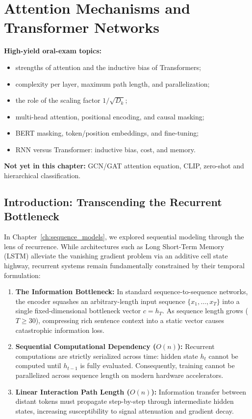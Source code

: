 \newpage

\chapter{Attention Mechanisms and Transformer Networks}\label{ch:attention_transformers}

\begin{ExamFocusBox}
\textbf{High-yield oral-exam topics:}
\begin{itemize}[nosep, leftmargin=*]
    \item strengths of attention and the inductive bias of Transformers;
    \item complexity per layer, maximum path length, and parallelization;
    \item the role of the scaling factor $1/\sqrt{D_k}$;
    \item multi-head attention, positional encoding, and causal masking;
    \item BERT masking, token/position embeddings, and fine-tuning;
    \item RNN versus Transformer: inductive bias, cost, and memory.
\end{itemize}
\textbf{Not yet in this chapter:} GCN/GAT attention equation, CLIP, zero-shot and hierarchical classification.
\end{ExamFocusBox}


\section{Introduction: Transcending the Recurrent Bottleneck}

In Chapter~\ref{ch:sequence_models}, we explored sequential modeling through the lens of recurrence. While architectures such as Long Short-Term Memory (LSTM) alleviate the vanishing gradient problem via an additive cell state highway, recurrent systems remain fundamentally constrained by their temporal formulation:

\begin{enumerate}[leftmargin=*]
    \item \textbf{The Information Bottleneck:} In standard sequence-to-sequence networks, the encoder squashes an arbitrary-length input sequence $\{x_1, \dots, x_T\}$ into a single fixed-dimensional bottleneck vector $c = h_T$. As sequence length grows ($T \ge 30$), compressing rich sentence context into a static vector causes catastrophic information loss.
    \item \textbf{Sequential Computational Dependency ($O(n)$):} Recurrent computations are strictly serialized across time: hidden state $h_t$ cannot be computed until $h_{t-1}$ is fully evaluated. Consequently, training cannot be parallelized across sequence length on modern hardware accelerators.
    \item \textbf{Linear Interaction Path Length ($O(n)$):} Information transfer between distant tokens must propagate step-by-step through intermediate hidden states, increasing susceptibility to signal attenuation and gradient decay.
\end{enumerate}

